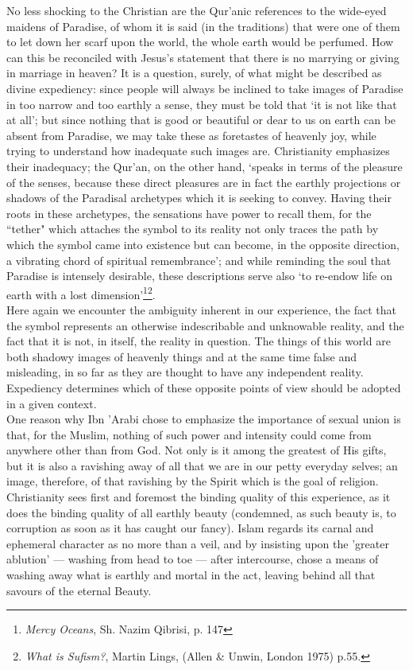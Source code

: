 \documentclass[10pt, twoside]{book}
\begin{document}
No less shocking to the Christian are the Qur'anic references to the wide\hyp{}eyed maidens of Paradise, 
of whom it is said (in the traditions) that were one of them to let down her scarf upon the world, 
the whole earth would be perfumed. How can this be reconciled with Jesus's statement that there is no 
marrying or giving in marriage in heaven? It is a question, surely, of what might be described as 
divine expediency: since people will always be inclined to take images of Paradise in too narrow and 
too earthly a sense, they must be told that `it is not like that at all'; but since nothing that is 
good or beautiful or dear to us on earth can be absent from Paradise, we may take these as foretastes 
of heavenly joy, while trying to understand how inadequate such images are. Christianity emphasizes 
their inadequacy; the Qur'an, on the other hand, `speaks in terms of the pleasure of the senses, 
because these direct pleasures are in fact the earthly projections or shadows of the Paradisal 
archetypes which it is seeking to convey. Having their roots in these archetypes, the sensations have 
power to recall them, for the ``tether" which attaches the symbol to its reality not only traces the 
path by which the symbol came into existence but can become, in the opposite direction, a vibrating 
chord of spiritual remembrance'; and while reminding the soul that Paradise is intensely desirable, 
these descriptions serve also `to re\hyp{}endow life on earth with a lost dimension'\footnote{\emph{Mercy Oceans}, Sh. Nazim Qibrisi, p. 147}\footnote{\emph{What is Sufism?}, Martin Lings, (Allen \& Unwin, London 1975) p.55.}. \\

Here again we encounter the ambiguity inherent in our experience, the fact that the symbol represents 
an otherwise indescribable and unknowable reality, and the fact that it is not, in itself, the 
reality in question. The things of this world are both shadowy images of heavenly things and at the 
same time false and misleading, in so far as they are thought to have any independent reality. 
Expediency determines which of these opposite points of view should be adopted in a given context. \\

One reason why Ibn 'Arabi chose to emphasize the importance of sexual union is that, for the Muslim, 
nothing of such power and intensity could come from anywhere other than from God. Not only is it 
among the greatest of His gifts, but it is also a ravishing away of all that we are in our petty 
everyday selves; an image, therefore, of that ravishing by the Spirit which is the goal of religion. 
Christianity sees first and foremost the binding quality of this experience, as it does the binding 
quality of all earthly beauty (condemned, as such beauty is, to corruption as soon as it has caught 
our fancy). Islam regards its carnal and ephemeral character as no more than a veil, and by insisting 
upon the 'greater ablution' --- washing from head to toe --- after intercourse, chose a means of washing 
away what is earthly and mortal in the act, leaving behind all that savours of the eternal Beauty. \\
\end{document}
